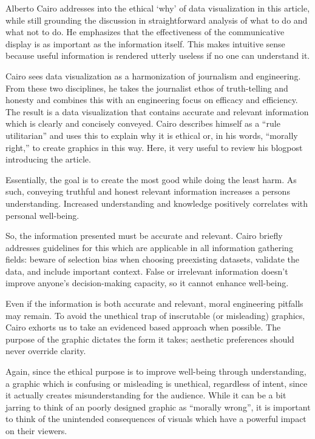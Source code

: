 \documentclass[]{book}
\theoremstyle{definition}
\theoremstyle{definition}
\theoremstyle{definition}
\theoremstyle{remark}
\begin{document}
Alberto Cairo addresses into the ethical `why' of data visualization in
this article, while still grounding the discussion in straightforward
analysis of what to do and what not to do. He emphasizes that the
effectiveness of the communicative display is as important as the
information itself. This makes intuitive sense because useful
information is rendered utterly useless if no one can understand it.

Cairo sees data visualization as a harmonization of journalism and
engineering. From these two disciplines, he takes the journalist ethos
of truth-telling and honesty and combines this with an engineering focus
on efficacy and efficiency. The result is a data visualization that
contains accurate and relevant information which is clearly and
concisely conveyed. Cairo describes himself as a ``rule utilitarian''
and uses this to explain why it is ethical or, in his words, ``morally
right,'' to create graphics in this way. Here, it very useful to review
his blogpost introducing the article.

Essentially, the goal is to create the most good while doing the least
harm. As such, conveying truthful and honest relevant information
increases a persons understanding. Increased understanding and knowledge
positively correlates with personal well-being.

So, the information presented must be accurate and relevant. Cairo
briefly addresses guidelines for this which are applicable in all
information gathering fields: beware of selection bias when choosing
preexisting datasets, validate the data, and include important context.
False or irrelevant information doesn't improve anyone's decision-making
capacity, so it cannot enhance well-being.

Even if the information is both accurate and relevant, moral engineering
pitfalls may remain. To avoid the unethical trap of inscrutable (or
misleading) graphics, Cairo exhorts us to take an evidenced based
approach when possible. The purpose of the graphic dictates the form it
takes; aesthetic preferences should never override clarity.

Again, since the ethical purpose is to improve well-being through
understanding, a graphic which is confusing or misleading is unethical,
regardless of intent, since it actually creates misunderstanding for the
audience. While it can be a bit jarring to think of an poorly designed
graphic as ``morally wrong'', it is important to think of the unintended
consequences of visuals which have a powerful impact on their viewers.
\end{document}

